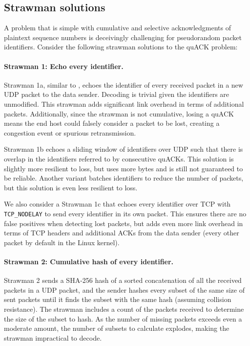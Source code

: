 \subsection{Strawman solutions}
\label{sec:quack:problem:strawmen}



A problem that is simple with cumulative and selective acknowledgments of
plaintext sequence numbers is deceivingly challenging for pseudorandom
packet identifiers. Consider the following strawman solutions to the quACK
problem:

\paragraph{Strawman 1: Echo every identifier.}
Strawman 1a, similar to \cite{li-tsvwg-loops-problem-opportunities-06,kramer2020lwpep},
echoes the identifier of every received packet in a new UDP packet to the data
sender.  Decoding is trivial given the identifiers are unmodified.
This strawman adds significant link overhead in terms of additional packets.
Additionally, since the strawman is not cumulative, losing a quACK means the
end host could falsely consider a packet to be lost, creating a congestion
event or spurious retransmission.

Strawman 1b echoes a sliding window of identifiers over UDP such that there is overlap
in the identifiers referred to by consecutive quACKs.
This solution is slightly more resilient to loss, but uses more bytes and is
still not guaranteed to be reliable.
Another variant batches identifiers to reduce the number of packets, but this
solution is even less resilient to loss.

We also consider a Strawman 1c that echoes every identifier over TCP with
\texttt{TCP\_NODELAY} to send every identifier in its own packet.
This ensures there are no false positives when detecting lost packets,
but adds even more link overhead in terms of TCP headers and additional ACKs
from the data sender (every other packet by default in the Linux kernel).

\paragraph{Strawman 2: Cumulative hash of every identifier.}
Strawman 2 sends a SHA-256 hash of a sorted concatenation of all the
received packets in a UDP packet, and the sender hashes every subset of the same size of
sent packets until it finds the subset with the same hash (assuming collision resistance).
The strawman includes
a count of the packets received to determine the size of the subset to hash.
As the number of missing packets exceeds even a moderate amount, the number
of subsets to calculate explodes, making the strawman impractical to decode.

